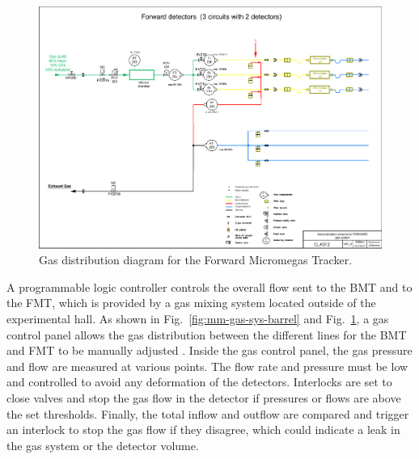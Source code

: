\begin{figure}[htb]
\includegraphics[width=2\columnwidth,keepaspectratio]{images/Clas12_Forward_V07_2}
 \caption{Gas distribution diagram for the Forward Micromegas Tracker.}
 \label{fig:mm-gas-sys-forward}
\end{figure}

A programmable logic controller controls the overall flow sent to the BMT and to the FMT, which is provided by a gas mixing
system located outside of the experimental hall. As shown in Fig.~\ref{fig:mm-gas-sys-barrel} and 
Fig.~\ref{fig:mm-gas-sys-forward}, a gas control panel allows the gas
distribution between the different lines for the BMT and FMT to be manually adjusted . Inside the gas control panel, the gas
pressure and flow are measured at various points. The flow rate and pressure must be low and controlled to avoid any
deformation of the detectors. Interlocks are set to close valves and stop the gas flow in the detector if pressures or flows are
above the set thresholds. Finally, the total inflow and outflow are compared and trigger an interlock to stop the gas flow if they
disagree, which could indicate a leak in the gas system or the detector volume. 
